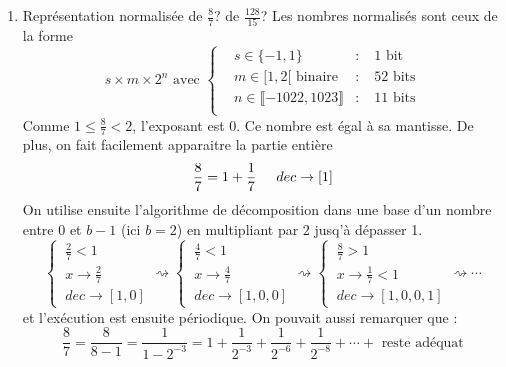 \begin{enumerate}
  \item Représentation normalisée de $\frac{8}{7}$? de $\frac{128}{15}$?\newline
Les nombres normalisés sont ceux de la forme
\begin{displaymath}
  s\times m \times 2^{n}\text{ avec }
\left\lbrace 
\begin{aligned}
  &s\in \{-1,1\} &:&\; 1\text{ bit}\\
  &m\in[1,2[ \text{ binaire } &:&\; 52 \text{ bits}\\
  &n \in \llbracket -1022, 1023 \rrbracket &:&\; 11 \text{ bits} \\ 
\end{aligned}
\right. 
\end{displaymath}
Comme $1\leq \frac{8}{7} < 2$, l'exposant est 0. Ce nombre est égal à sa mantisse. De plus, on fait facilement apparaitre la partie entière
\begin{displaymath}
  \frac{8}{7} = 1 + \frac{1}{7} \hspace{0.5cm} dec \rightarrow [1]
\end{displaymath}
On utilise ensuite l'algorithme de décomposition dans une base d'un nombre entre 0 et $b-1$ (ici $b=2$) en multipliant par $2$ jusq'à dépasser 1.
\begin{displaymath}
\left\lbrace \
\begin{aligned}
\frac{2}{7} <1\\
x \rightarrow\frac{2}{7}\\  
dec \rightarrow [1,0]  
\end{aligned}
\right. 
\rightsquigarrow
\left\lbrace \
\begin{aligned}
\frac{4}{7} <1\\
x \rightarrow\frac{4}{7}\\  
dec \rightarrow [1,0,0]  
\end{aligned}
\right. 
\rightsquigarrow
\left\lbrace \
\begin{aligned}
\frac{8}{7} >1\\
x \rightarrow\frac{1}{7} <1\\  
dec \rightarrow [1,0,0,1]  
\end{aligned}
\right. 
\rightsquigarrow \cdots
\end{displaymath}
et l'exécution est ensuite périodique. On pouvait aussi remarquer que :
\begin{displaymath}
  \frac{8}{7} = \frac{8}{8 -1} = \frac{1}{1-2^{-3}} = 1 + \frac{1}{2^{-3}}+ \frac{1}{2^{-6}}+ \frac{1}{2^{-8}}+\cdots+ \text{ reste adéquat}
\end{displaymath}

\end{enumerate}
